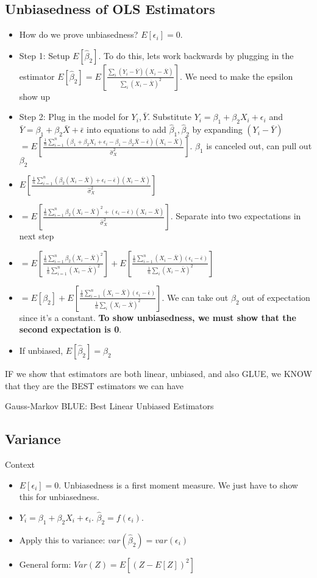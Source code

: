 \documentclass[10pt, oneside]{article}
\begin{document}
\subsection{Unbiasedness of OLS Estimators}
\begin{itemize}
    \item How do we prove unbiasedness? $E[\epsilon_i]=0$. 
    \item Step 1: Setup $E[\hat \beta_2 ]$. To do this, lets work backwards by plugging in the estimator $E[\hat \beta_2]=E[\frac{\sum_i (Y_i -\bar Y) (X_i -\bar X)}{\sum_i (X_i -\bar X)^2}]$. We need to make the epsilon show up 
    \item Step 2: Plug in the model for $Y_i, \bar Y$. Substitute $Y_i=\beta_1 + \beta_2 X_i + \epsilon_i$ and $\bar Y=\beta_1 +\beta_2 \bar X + \bar \epsilon$ into equations to add $\hat \beta_1, \hat \beta_2$ by expanding $(Y_i -\bar Y)$ \\
    $=E[\frac{\frac{1}{n} 
    \sum_{i=1} ^ n(\beta_1 + \beta_2 X_i + \epsilon_i - \beta_1 - \beta_2 \bar X -\bar \epsilon)(X_i -\bar X)}{\hat \sigma_X ^2}]$. $\beta_1$ is canceled out, can pull out $\beta_2$
    \item $E[\frac{\frac{1}{n} \sum_{i=1} ^ n (\beta_2 (X_i -\bar X) + \epsilon_i -\bar \epsilon)(X_i -\bar X)}{\hat \sigma_X ^2}]$
    \item $=E[\frac{\frac{1}{n} \sum_{i=1}^n \beta_2 (X_i - \bar X)^2 + (\epsilon_i -\bar \epsilon) (X_i -\bar X)}{\hat \sigma_X ^2}]$. Separate into two expectations in next step
    \item $=E[\frac{\frac{1}{n}\sum_{i=1} ^n \beta_2 (X_i -\bar X)^2}{\frac{1}{n} \sum_{i=1} ^n (X_i - \bar X)^2}] + E[ \frac{\frac{1}{n}\sum_{i=1} ^ n (X_i -\bar X) (\epsilon_i -\bar \epsilon)}{\frac{1}{n} \sum_i(X_i -\bar X)^2}]$
    \item $=E[\beta_2] + E[ \frac{\frac{1}{n}\sum_{i=1} ^ n (X_i -\bar X) (\epsilon_i -\bar \epsilon)}{\frac{1}{n} \sum_i(X_i -\bar X)^2}]$. We can take out $\beta_2$ out of expectation since it's a constant. \textbf{To show unbiasedness, we must show that the second expectation is 0}.
    \item If unbiased, $E[\hat \beta_2] = \beta_2$
\end{itemize}

IF we show that estimators are both linear, unbiased, and also GLUE, we KNOW that they are the BEST estimators we can have

Gauss-Markov BLUE: Best Linear Unbiased Estimators
\subsection{Variance}
Context
\begin{itemize}
    \item $E[\epsilon_i] =0$. Unbiasedness is a first moment measure. We just have to show this for unbiasedness.
    \item $Y_i = \beta_1 + \beta_2 X_i +\epsilon_i$. $\hat \beta_2 =f(\epsilon_i)$.
    \item Apply this to variance: $var(\hat \beta_2) = var(\epsilon_i)$
    \item General form: $Var(Z)=E[(Z-E[Z])^2]$
\end{itemize}
\end{document}
